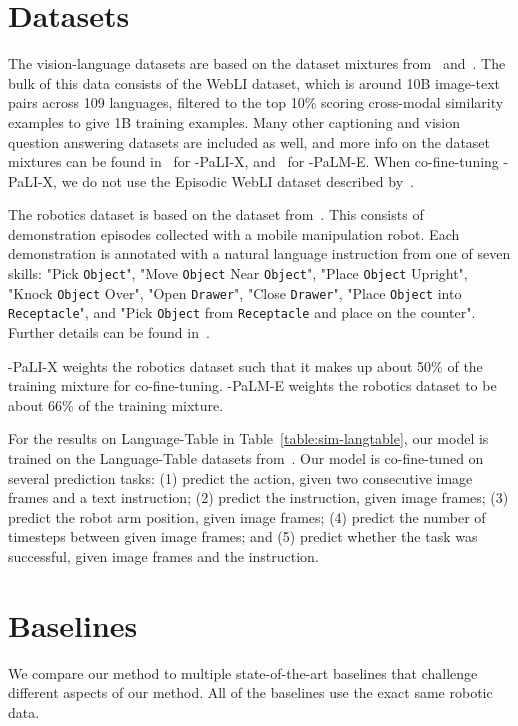 \section{Datasets}
\label{sec:app_data}

The vision-language datasets are based on the dataset mixtures from~\citet{chen2023pali} and~\citet{driess2023palm}. The bulk of this data consists of the WebLI dataset, which is around 10B image-text pairs across 109 languages, filtered to the top 10\% scoring cross-modal similarity examples to give 1B training examples. Many other captioning and vision question answering datasets are included as well, and more info on the dataset mixtures can be found in~\citet{chen2023pali} for \methodname-PaLI-X, and~\citet{driess2023palm} for \methodname-PaLM-E. When co-fine-tuning \methodname-PaLI-X, we do not use the Episodic WebLI dataset described by~\citet{chen2023palix}.

The robotics dataset is based on the dataset from~\citet{brohan2022rt}. This consists of demonstration episodes collected with a mobile manipulation robot. Each demonstration is annotated with a natural language instruction from one of seven skills: "Pick \texttt{Object}", "Move \texttt{Object} Near \texttt{Object}", "Place \texttt{Object} Upright", "Knock \texttt{Object} Over", "Open \texttt{Drawer}", "Close \texttt{Drawer}", "Place \texttt{Object} into \texttt{Receptacle}", and "Pick \texttt{Object} from \texttt{Receptacle} and place on the counter". Further details can be found in~\citet{brohan2022rt}.

\methodname-PaLI-X weights the robotics dataset such that it makes up about 50\% of the training mixture for co-fine-tuning. \methodname-PaLM-E weights the robotics dataset to be about 66\% of the training mixture.

For the results on Language-Table in Table~\ref{table:sim-langtable}, our model is trained on the Language-Table datasets from~\citet{lynch2022interactive}. Our model is co-fine-tuned on several prediction tasks: (1) predict the action, given two consecutive image frames and a text instruction; (2) predict the instruction, given image frames; (3) predict the robot arm position, given image frames; (4) predict the number of timesteps between given image frames; and (5) predict whether the task was successful, given image frames and the instruction.

\section{Baselines}
\label{sec:app_baselines}
We compare our method to multiple state-of-the-art baselines that challenge different aspects of our method. All of the baselines use the exact same robotic data. 

